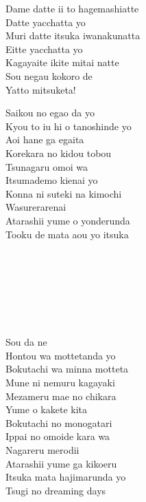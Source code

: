 \begin{multicols}{2}
Dame datte ii to hagemashiatte\\
Datte yacchatta yo\\
Muri datte itsuka iwanakunatta\\
Eitte yacchatta yo\\
Kagayaite ikite mitai natte\\
Sou negau kokoro de\\
Yatto mitsuketa!\columnbreak

Saikou no egao da yo\\
Kyou to iu hi o tanoshinde yo\\
Aoi hane ga egaita\\
Korekara no kidou tobou\\
Tsunagaru omoi wa\\
Itsumademo kienai yo\\
Konna ni suteki na kimochi\\
Wasurerarenai\\
Atarashii yume o yonderunda\\
Tooku de mata aou yo itsuka\\

 \\
 \\
 \\
 \\
\\
\\
 \\

Sou da ne\\
Hontou wa mottetanda yo\\
Bokutachi wa minna motteta\\
Mune ni nemuru kagayaki\\
Mezameru mae no chikara\\
Yume o kakete kita\\
Bokutachi no monogatari\\
Ippai no omoide kara wa\\
Nagareru merodii\\
Atarashii yume ga kikoeru\\
Itsuka mata hajimarunda yo\\
Tsugi no dreaming days\\
\end{multicols}

\ifdefined\COMPLETE
\else
	
\fi
